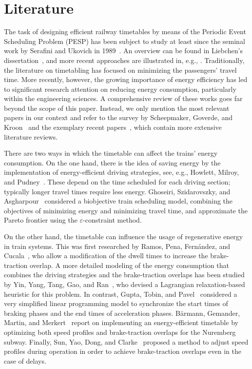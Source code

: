 \documentclass[11pt,a4paper]{article}
\theoremstyle{definition}
\theoremstyle{remark}
\begin{document}
\section{Literature}
\label{sec-literature}


The task of designing efficient railway timetables by means of the Periodic Event Scheduling Problem (PESP) has been subject to study at least since the seminal work by Serafini and Ukovich in 1989~\cite{Serafini1989}. An overview can be found in Liebchen's dissertation~\cite{Liebchen2006}, and more recent approaches are illustrated in, e.g., \cite{borndorfer_concurrent_2020,grafe_et_al:OASIcs.ATMOS.2021.9,bortoletto_tropical_2022}. Traditionally, the literature on timetabling has focused on minimizing the passengers' travel time. More recently, however, the growing importance of energy efficiency has led to significant research attention on reducing energy consumption, particularly within the engineering sciences. A comprehensive review of these works goes far beyond the scope of this paper. Instead, we only mention the most relevant papers in our context and refer to the survey by Scheepmaker, Goverde, and Kroon~\cite{Scheepmaker2017} and the exemplary recent papers~\cite{Mo2020,Liao2021,%
Huang2025}, which contain more extensive literature reviews.

There are two ways in which the timetable can affect the trains' energy consumption. On the one hand, there is the idea of saving energy by the implementation of energy-efficient driving strategies, see, e.g., Howlett, Milroy, and Pudney~\cite{Howlett1994}. These depend on the time scheduled for each driving section; typically longer travel times require less energy. Ghoseiri, Szidarovszky, and Asgharpour~\cite{Ghoseiri2004} considered a biobjective train scheduling model, combining the objectives of minimizing energy and minimizing travel time, and approximate the Pareto frontier using the $\varepsilon$-constraint method. 

On the other hand, the timetable can influence the usage of regenerative energy in train systems. This was first researched by Ramos, Pena, Fernández, and Cucala~\cite{Ramos2008}, who allow a modification of the dwell times to increase the brake-traction overlap. A more detailed modeling of the energy consumption that combines the driving strategies and the brake-traction overlaps has been studied by Yin, Yang, Tang, Gao, and Ran~\cite{Yin2017}, who devised a Lagrangian relaxation-based heuristic for this problem. In contrast, Gupta, Tobin, and Pavel~\cite{Gupta2016} considered a very simplified linear programming model to synchronize the start times of braking phases and the end times of acceleration phases. Bärmann, Gemander, Martin, and Merkert~\cite{barmann_energy-efficient_2021} report on implementing an energy-efficient timetable by optimizing both speed profiles and brake-traction overlaps for the Nuremberg subway.
Finally, Sun, Yao, Dong, and Clarke~\cite{Sun2023a} proposed a method to adjust speed profiles during operation in order to achieve brake-traction overlaps even in the case of delays.
\end{document}
